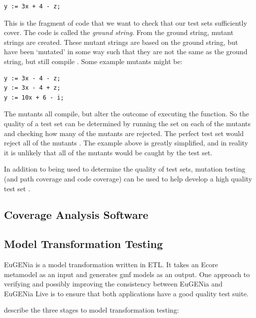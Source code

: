 \begin{lstlisting}
y := 3x + 4 - z;
\end{lstlisting}

This is the fragment of code that we want to check that our test sets sufficiently cover. The code is called the \emph{ground string}. From the ground string, mutant strings are created. These mutant strings are based on the ground string, but have been `mutated' in some way such that they are not the same as the ground string, but still compile \citep{softwareTestingIntro}. Some example mutants might be:

\begin{lstlisting}
y := 3x - 4 - z;
y := 3x - 4 + z;
y := 10x + 6 - i;
\end{lstlisting}

The mutants all compile, but alter the outcome of executing the function. So the quality of a test set can be determined by running the set on each of the mutants and checking how many of the mutants are rejected. The perfect test set would reject all of the mutants \citep{softwareTestingIntro}. The example above is greatly simplified, and in reality it is unlikely that all of the mutants would be caught by the test set.

In addition to being used to determine the quality of test sets, mutation testing (and path coverage and code coverage) can be used to help develop a high quality test set \citep{softwareTestingIntro}.

\subsection{Coverage Analysis Software}

\subsection{Model Transformation Testing}

EuGENia is a model transformation written in ETL. It takes an Ecore metamodel as an input and generates gmf models as an output\citep{eugeniaSite}. One approach to verifying and possibly improving the consistency between EuGENia and EuGENia Live is to ensure that both applications have a good quality test suite.

\citet{mttBarriers} describe the three stages to model transformation testing:

